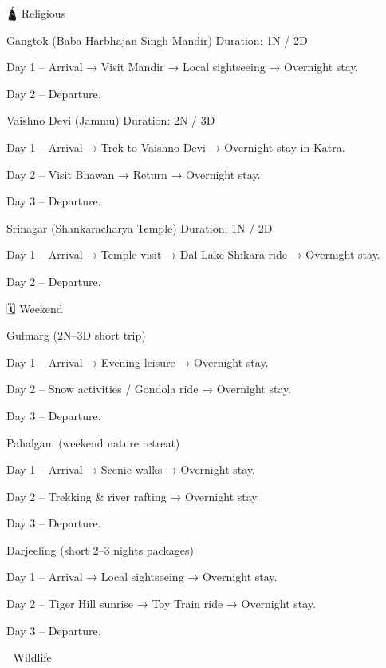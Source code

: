 🛕 Religious

Gangtok (Baba Harbhajan Singh Mandir)
Duration: 1N / 2D

Day 1 – Arrival → Visit Mandir → Local sightseeing → Overnight stay.

Day 2 – Departure.

Vaishno Devi (Jammu)
Duration: 2N / 3D

Day 1 – Arrival → Trek to Vaishno Devi → Overnight stay in Katra.

Day 2 – Visit Bhawan → Return → Overnight stay.

Day 3 – Departure.

Srinagar (Shankaracharya Temple)
Duration: 1N / 2D

Day 1 – Arrival → Temple visit → Dal Lake Shikara ride → Overnight stay.

Day 2 – Departure.

🗓 Weekend

Gulmarg (2N–3D short trip)

Day 1 – Arrival → Evening leisure → Overnight stay.

Day 2 – Snow activities / Gondola ride → Overnight stay.

Day 3 – Departure.

Pahalgam (weekend nature retreat)

Day 1 – Arrival → Scenic walks → Overnight stay.

Day 2 – Trekking & river rafting → Overnight stay.

Day 3 – Departure.

Darjeeling (short 2–3 nights packages)

Day 1 – Arrival → Local sightseeing → Overnight stay.

Day 2 – Tiger Hill sunrise → Toy Train ride → Overnight stay.

Day 3 – Departure.

🐅 Wildlife

